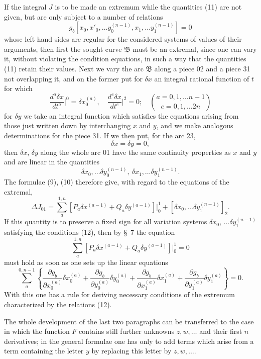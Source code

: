 \documentclass[11pt,a4paper,leqno]{article}
\begin{document}
If the integral $J$ is to be made an extremum while the quantities (11) are not given, but are only subject to a number of relations
\begin{equation}\tag{12}
g_b[x_0,x'_0,\ldots y_0^{(n-1)},x_1,\ldots y_1^{(n-1)}]=0
\end{equation}
whose left hand sides are regular for the considered systems of values of their arguments, then first the sought curve $\mathfrak B$ must be an extremal, since one can vary it, without violating the
condition equations, in such a way that the quantities (11) retain their values. Next we vary the arc $\mathfrak B$ along a piece 02 and a piece 31 not overlapping it, and on the former put for $\delta x$ an integral rational function of $t$ for which
\[
\frac{d^a\delta x}{dt^a}\bigg|^0=\delta x_0^{(a)},\quad
\frac{d^e\delta x}{dt^e}\bigg|^2=0;\quad
\binom{a=0,1,\ldots n-1}{e=0,1,\ldots 2n}
\]
for $\delta y$ we take an integral function which satisfies the equations arising from those just written down by interchanging $x$ and $y$, and we make analogous determinations for the piece 31. If we then put, for the arc 23,
\[
\delta x=\delta y=0,
\]
then $\delta x$, $\delta y$ along the whole arc 01 have the same continuity properties as $x$ and $y$ and are linear in the quantities
\[
\delta x_0,\ldots \delta y_0^{(n-1)},\ \delta x_1,\ldots \delta y_1^{(n-1)}.
\]
The formulae (9), (10) therefore give, with regard to the equations of the extremal,
\[
\Delta J_{01}=\sum_a^{1,n}[P_a\delta x^{(a-1)}+Q_a\delta y^{(a-1)}]\bigg|_0^1
+[\delta x_0,\ldots \delta y_1^{(n-1)}]_2.
\]
If this quantity is to preserve a fixed sign for all variation systems $\delta x_0$, $\ldots\delta y_1^{(n-1)}$ satisfying the conditions (12), then by \S~7 the equation
\[
\sum_a^{1,n}[P_a\delta x^{(a-1)}+Q_a\delta y^{(a-1)}]\bigg|_0^1=0
\]
must hold as soon as one sets up the linear equations
\[
\sum_a^{0,n-1}\left\{\frac{\partial g_b}{\partial x_0^{(a)}}\delta x_0^{(a)}+\frac{\partial g_b}{\partial y_0^{(a)}}\delta y_0^{(a)}+\frac{\partial g_b}{\partial x_1^{(a)}}\delta x_1^{(a)}
+\frac{\partial g_b}{\partial y_1^{(a)}}\delta y_1^{(a)}\right\}=0.
\]
With this one has a rule for deriving necessary conditions of the extremum characterized by the relations (12).

The whole development of the last two paragraphs can be transferred to the case in which the function $F$ contains still further unknowns $z,w,\ldots$ and their first $n$ derivatives; in the general formulae one has only to add terms
which arise from a term containing the letter $y$ by replacing this letter by $z,w,\ldots$.
\end{document}

